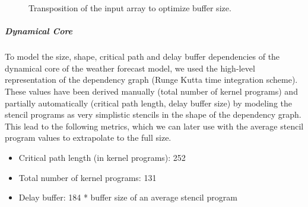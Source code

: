 \begin{figure}%
	\centering
	\qquad
	\caption{Transposition of the input array to optimize buffer size.}
	\label{fig:optimizer-iteration-xyz-optimizer-iteration-xzy}
\end{figure}


\subparagraph{Dynamical Core}
To model the size, shape, critical path and delay buffer dependencies of the dynamical core of the weather forecast model, we used the high-level representation of the dependency graph (Runge Kutta time integration scheme). These values have been derived manually (total number of kernel programs) and partially automatically (critical path length, delay buffer size) by modeling the stencil programs as very simplistic stencils in the shape of the dependency graph. This lead to the following metrics, which we can later use with the average stencil program values to extrapolate to the full size.
\begin{itemize}
	\item Critical path length (in kernel programs): 252
	\item Total number of kernel programs: 131
	\item Delay buffer: 184 * buffer size of an average stencil program
\end{itemize}

